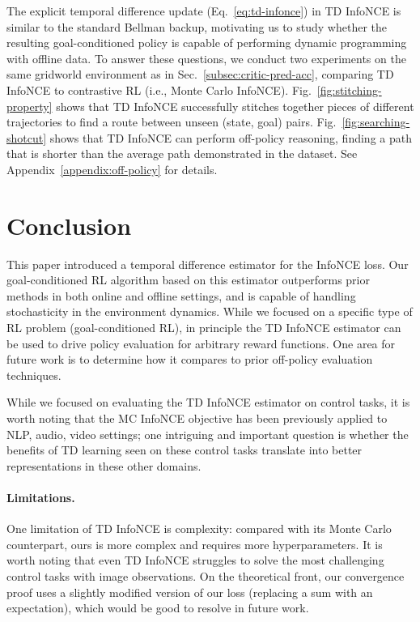 \documentclass{article} %
\begin{document}
The explicit temporal difference update (Eq.~\ref{eq:td-infonce}) in TD InfoNCE is similar to the standard Bellman backup, motivating us to study whether the resulting goal-conditioned policy is capable of performing dynamic programming with offline data. To answer these questions, we conduct two experiments on the same gridworld environment as in Sec.~\ref{subsec:critic-pred-acc}, comparing TD InfoNCE to contrastive RL (i.e., Monte Carlo InfoNCE).
Fig.~\ref{fig:stitching-property} shows that TD InfoNCE successfully stitches together pieces of different trajectories to find a route between unseen (state, goal) pairs. Fig.~\ref{fig:searching-shotcut} shows that TD InfoNCE can perform off-policy reasoning, finding a path that is shorter than the average path demonstrated in the dataset. See Appendix~\ref{appendix:off-policy} for details.





\section{Conclusion}
\label{sec:conclusion}

This paper introduced a temporal difference estimator for the InfoNCE loss. Our goal-conditioned RL algorithm based on this estimator outperforms prior methods in both online and offline settings, and is capable of handling stochasticity in the environment dynamics.
While we focused on a specific type of RL problem (goal-conditioned RL), in principle the TD InfoNCE estimator can be used to drive policy evaluation for arbitrary reward functions. One area for future work is to determine how it compares to prior off-policy evaluation techniques.

While we focused on evaluating the TD InfoNCE estimator on control tasks, it is worth noting that the MC InfoNCE objective has been previously applied to NLP, audio, video settings; one intriguing and important question is whether the benefits of TD learning seen on these control tasks translate into better representations in these other domains.

\paragraph{Limitations.} One limitation of TD InfoNCE is complexity: compared with its Monte Carlo counterpart, ours is more complex and requires more hyperparameters. It is worth noting that even TD InfoNCE struggles to solve the most challenging control tasks with image observations. On the theoretical front, our convergence proof uses a slightly modified version of our loss (replacing a sum with an expectation), which would be good to resolve in future work.
\end{document}
